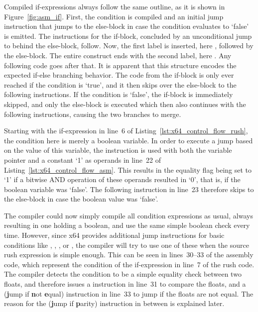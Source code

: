 Compiled if-expressions always follow the same outline, as it is shown in Figure~\ref{fig:asm_if}.
First, the condition is compiled and an initial jump instruction that jumps to the else-block in case the condition evaluates to `false' is emitted.
The instructions for the if-block, concluded by an unconditional jump to behind the else-block, follow.
Now, the first label is inserted, here , followed by the else-block.
The entire construct ends with the second label, here .
Any following code goes after that.
It is apparent that this structure encodes the expected if-else branching behavior.
The code from the if-block is only ever reached if the condition is `true', and it then skips over the else-block to the following instructions.
If the condition is `false', the if-block is immediately skipped, and only the else-block is executed which then also continues with the following instructions, causing the two branches to merge.

Starting with the if-expression in line~6 of Listing~\ref{lst:x64_control_flow_rush}, the condition here is merely a boolean variable.
In order to execute a jump based on the value of this variable, the  instruction is used with both the variable pointer and a constant `1' as operands in line~22 of Listing~\ref{lst:x64_control_flow_asm}.
This results in the equality flag being set to `1' if a bitwise AND operation of these operands resulted in `0', that is, if the boolean variable was `false'.
The following  instruction in line~23 therefore skips to the else-block in case the boolean value was `false'.

The compiler could now simply compile all condition expressions as usual, always resulting in one  holding a boolean, and use the same simple boolean check every time.
However, since x64 provides additional jump instructions for basic conditions like \qVerb{==}, \qVerb{!=}, \qVerb{>=}, or \qVerb{<}, the compiler will try to use one of these when the source rush expression is simple enough.
This can be seen in lines~30--33 of the assembly code, which represent the condition of the if-expression in line~7 of the rush code.
The compiler detects the condition to be a simple equality check between two floats, and therefore issues a  instruction in line~31 to compare the floats, and a  (\textbf{j}ump if \textbf{n}ot \textbf{e}qual) instruction in line~33 to jump if the floats are not equal.
The reason for the \label{x64_ucomisd} (\textbf{j}ump if \textbf{p}arity) instruction in between is explained later.


